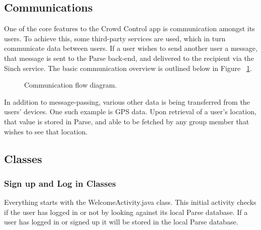  
 \subsection{Communications}
 One of the core features to the Crowd Control app is communication amongst its users. To achieve this, some third-party services are used, which in turn communicate data between users. If a user wishes to send another user a message, that message is sent to the Parse back-end, and delivered to the recipient via the Sinch service. The basic communication overview is outlined below in Figure ~\ref{CommFlow}.
 
  	\begin{figure}[tbh]
	\begin{center}
	\end{center}
	\caption{Communication flow diagram. \label{CommFlow}}
	\end{figure}
 
 In addition to message-passing, various other data is being transferred from the users' devices. One such example is GPS data. Upon retrieval of a user's location, that value is stored in Parse, and able to be fetched by any group member that wishes to see that location. 

 \subsection{Classes}
 
 	\subsubsection{Sign up and Log in Classes}
 	Everything starts with the WelcomeActivity.java class. This initial activity checks if the user has logged in or not by looking against its local Parse database. If a user has logged in or signed up it will be stored in the local Parse database.
 	
